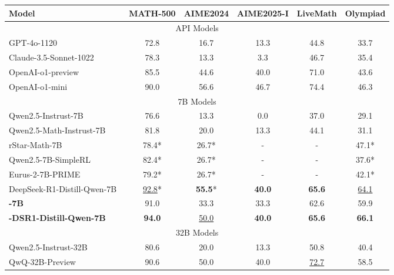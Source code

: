 \begin{table}[t]
\centering
\small
\begin{tabular}{l@{\hspace{0.1pt}}c@{\hspace{6pt}}c@{\hspace{6pt}}c@{\hspace{6pt}}c@{\hspace{6pt}}c}
\toprule
\textbf{Model} & \textbf{MATH-500} & \textbf{AIME2024} & \textbf{AIME2025-I} & \textbf{LiveMath} & \textbf{Olympiad} \\ \midrule
\multicolumn{6}{c}{API Models} \\ \midrule
GPT-4o-1120~\cite{gpt4o} & 72.8 & 16.7 & 13.3 & 44.8 & 33.7 \\
Claude-3.5-Sonnet-1022~\cite{claude35sonnet} & 78.3 & 13.3 & 3.3 & 46.7 & 35.4 \\
OpenAI-o1-preview~\cite{openai2024learning} & 85.5 & 44.6 & 40.0 & 71.0 & 43.6 \\
OpenAI-o1-mini~\cite{openai2024learning} & 90.0 & 56.6 & 46.7 & 74.4 & 46.3 \\ \midrule
\multicolumn{6}{c}{7B Models} \\ \midrule
Qwen2.5-Instrust-7B~\cite{yang2024qwen2} & 76.6 & 13.3 & 0.0 & 37.0 & 29.1 \\
Qwen2.5-Math-Instrust-7B~\cite{yang2024qwen2} & 81.8 & 20.0 & 13.3 & 44.1 & 31.1 \\
rStar-Math-7B~\cite{guan2025rstar}  & 78.4* & 26.7* & - & - & 47.1* \\
Qwen2.5-7B-SimpleRL~\cite{zeng2025simplerl}  & 82.4* & 26.7* & - & - & 37.6* \\
Eurus-2-7B-PRIME~\cite{cui2025process} & 79.2* & 26.7* & - & - & 42.1* \\
DeepSeek-R1-Distill-Qwen-7B~\cite{deepseekr1} & \underline{92.8}* & \textbf{55.5}* & \textbf{40.0} & \textbf{65.6} & \underline{64.1} \\
\textbf{\methodname{}-7B} & 91.0 & 33.3 & 33.3 & 62.6 & 59.9 \\ 
\textbf{\methodname{}-DSR1-Distill-Qwen-7B}  & \textbf{94.0} & \underline{50.0} & \textbf{40.0} & \textbf{65.6} & \textbf{66.1} \\  \midrule
\multicolumn{6}{c}{32B Models} \\ \midrule
Qwen2.5-Instrust-32B~\cite{yang2024qwen2} & 80.6 & 20.0 & 13.3 & 50.8 & 40.4 \\
QwQ-32B-Preview~\cite{qwq-32b-preview} & 90.6 & 50.0 & 40.0 & \underline{72.7} & 58.5 \\

\end{tabular}
\end{table}
